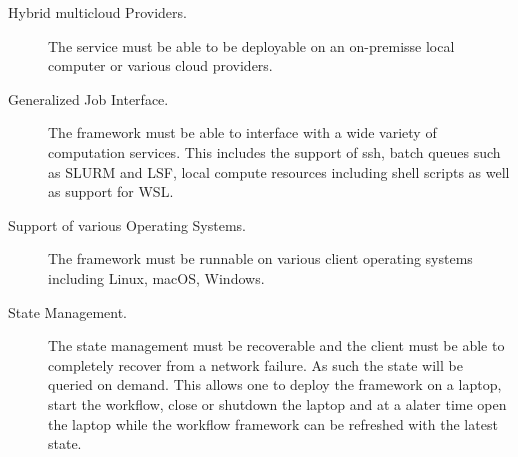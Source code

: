 \begin{description}
\item[Hybrid multicloud Providers.] The service must be able to be deployable on an on-premisse local computer or various cloud providers.

\item[Generalized Job Interface.] The framework must be able to interface 
with a wide variety of computation services. This includes the support
of ssh, batch queues such as SLURM and LSF, local compute resources
including shell scripts as well as support for WSL.

\item[Support of various Operating Systems.] The framework must be runnable on various client operating systems including Linux, macOS, Windows.

\item[State Management.] The state management must be recoverable and the client must be able to completely recover from a network failure. As such the state will be queried on demand. This allows one to deploy the framework on a laptop, start the workflow, close or shutdown the laptop and at a alater time open the laptop while the workflow framework can be refreshed with the latest state.

\end{description}

